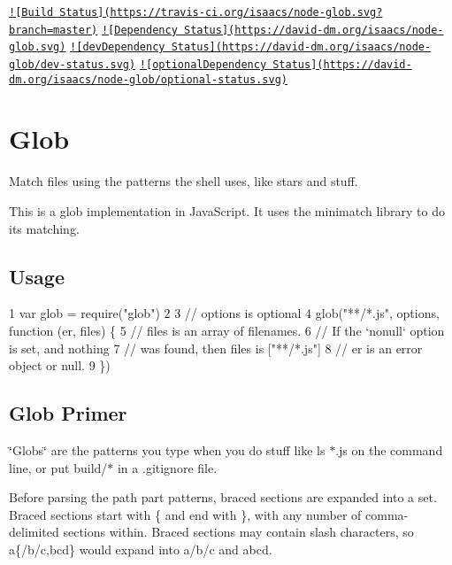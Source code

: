 \href{https://travis-ci.org/isaacs/node-glob/}{\tt !\mbox{[}Build Status\mbox{]}(https\+://travis-\/ci.\+org/isaacs/node-\/glob.\+svg?branch=master)} \href{https://david-dm.org/isaacs/node-glob}{\tt !\mbox{[}Dependency Status\mbox{]}(https\+://david-\/dm.\+org/isaacs/node-\/glob.\+svg)} \href{https://david-dm.org/isaacs/node-glob#info=devDependencies}{\tt !\mbox{[}dev\+Dependency Status\mbox{]}(https\+://david-\/dm.\+org/isaacs/node-\/glob/dev-\/status.\+svg)} \href{https://david-dm.org/isaacs/node-glob#info=optionalDependencies}{\tt !\mbox{[}optional\+Dependency Status\mbox{]}(https\+://david-\/dm.\+org/isaacs/node-\/glob/optional-\/status.\+svg)}

\section*{Glob}

Match files using the patterns the shell uses, like stars and stuff.

This is a glob implementation in Java\+Script. It uses the {\ttfamily minimatch} library to do its matching.



\subsection*{Usage}


\begin{DoxyCode}
1 var glob = require("glob")
2 
3 // options is optional
4 glob("**/*.js", options, function (er, files) \{
5   // files is an array of filenames.
6   // If the `nonull` option is set, and nothing
7   // was found, then files is ["**/*.js"]
8   // er is an error object or null.
9 \})
\end{DoxyCode}


\subsection*{Glob Primer}

\char`\"{}\+Globs\char`\"{} are the patterns you type when you do stuff like {\ttfamily ls $\ast$.js} on the command line, or put {\ttfamily build/$\ast$} in a {\ttfamily .gitignore} file.

Before parsing the path part patterns, braced sections are expanded into a set. Braced sections start with {\ttfamily \{} and end with {\ttfamily \}}, with any number of comma-\/delimited sections within. Braced sections may contain slash characters, so {\ttfamily a\{/b/c,bcd\}} would expand into {\ttfamily a/b/c} and {\ttfamily abcd}.

